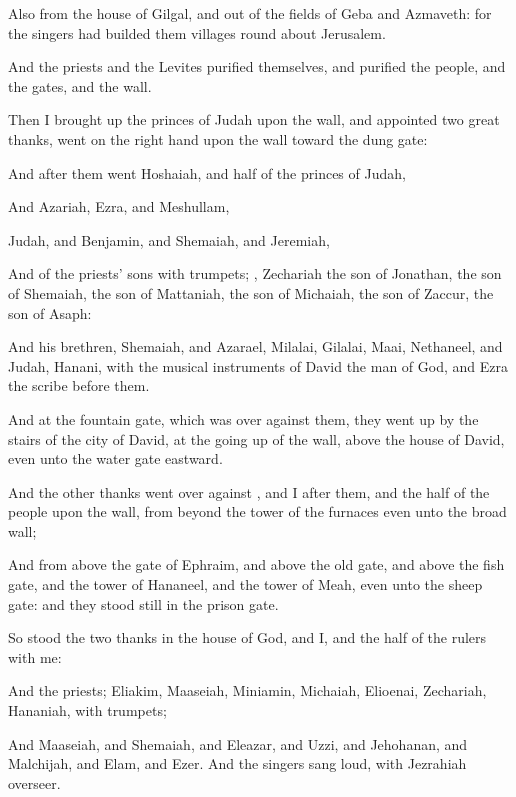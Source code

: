 {Also from the
house of
Gilgal, and out of the
fields of
Geba and
Azmaveth: for the
singers had
builded them
villages round
about
Jerusalem.

And the
priests and the
Levites
purified themselves, and
purified the
people, and the
gates, and the
wall.

Then I brought
up the
princes of
Judah upon the
wall, and
appointed
two
great
{}
thanks,
{}
went on the right
hand upon the
wall toward the
dung
gate:

And
after them
went
Hoshaiah, and
half of the
princes of
Judah,

And
Azariah,
Ezra, and
Meshullam,

Judah, and
Benjamin, and
Shemaiah, and
Jeremiah,

And
{} of the
priests’
sons with
trumpets;
{},
Zechariah the
son of
Jonathan, the
son of
Shemaiah, the
son of
Mattaniah, the
son of
Michaiah, the
son of
Zaccur, the
son of
Asaph:

And his
brethren,
Shemaiah, and
Azarael,
Milalai,
Gilalai,
Maai,
Nethaneel, and
Judah,
Hanani, with the
musical
instruments of
David the
man of
God, and
Ezra the
scribe
before them.

And at the
fountain
gate, which was over against them, they went
up by the
stairs of the
city of
David, at the going
up of the
wall, above the
house of
David, even unto the
water
gate
eastward.

And the
other
{}
thanks
went over
against
{}, and I
after them, and the
half of the
people upon the
wall, from beyond the
tower of the
furnaces even unto the
broad
wall;

And from above the
gate of
Ephraim, and above the
old
gate, and above the
fish
gate, and the
tower of
Hananeel, and the
tower of
Meah, even unto the
sheep
gate: and they stood
still in the
prison
gate.

So
stood the
two
{}
thanks in the
house of
God, and I, and the
half of the
rulers with me:

And the
priests;
Eliakim,
Maaseiah,
Miniamin,
Michaiah,
Elioenai,
Zechariah,
{}
Hananiah, with
trumpets;

And
Maaseiah, and
Shemaiah, and
Eleazar, and
Uzzi, and
Jehohanan, and
Malchijah, and
Elam, and
Ezer. And the
singers sang
loud, with
Jezrahiah
{}
overseer.

}
